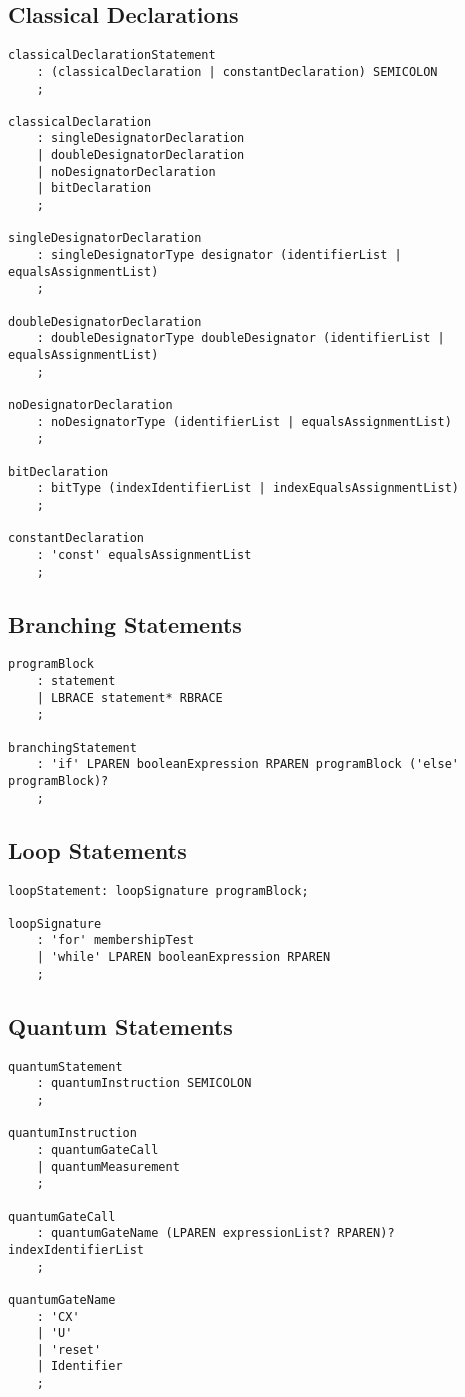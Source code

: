 \documentclass[12pt,a4paper]{report}
\theoremstyle{definition}
\theoremstyle{definition}
\theoremstyle{definition}
\begin{document}
\subsection{Classical Declarations}
\begin{lstlisting}
classicalDeclarationStatement
    : (classicalDeclaration | constantDeclaration) SEMICOLON
    ;

classicalDeclaration
    : singleDesignatorDeclaration
    | doubleDesignatorDeclaration
    | noDesignatorDeclaration
    | bitDeclaration
    ;

singleDesignatorDeclaration
    : singleDesignatorType designator (identifierList | equalsAssignmentList)
    ;

doubleDesignatorDeclaration
    : doubleDesignatorType doubleDesignator (identifierList | equalsAssignmentList)
    ;

noDesignatorDeclaration
    : noDesignatorType (identifierList | equalsAssignmentList)
    ;

bitDeclaration
    : bitType (indexIdentifierList | indexEqualsAssignmentList)
    ;

constantDeclaration
    : 'const' equalsAssignmentList
    ;
\end{lstlisting}

\subsection{Branching Statements}
\begin{lstlisting}
programBlock
    : statement
    | LBRACE statement* RBRACE
    ;

branchingStatement
    : 'if' LPAREN booleanExpression RPAREN programBlock ('else' programBlock)?
    ;
\end{lstlisting}


\subsection{Loop Statements}
\begin{lstlisting}
loopStatement: loopSignature programBlock;

loopSignature
    : 'for' membershipTest
    | 'while' LPAREN booleanExpression RPAREN
    ;
\end{lstlisting}


\subsection{Quantum Statements}
\begin{lstlisting}
quantumStatement
    : quantumInstruction SEMICOLON
    ;

quantumInstruction
    : quantumGateCall
    | quantumMeasurement
    ;

quantumGateCall
    : quantumGateName (LPAREN expressionList? RPAREN)? indexIdentifierList
    ;

quantumGateName
    : 'CX'
    | 'U'
    | 'reset'
    | Identifier
    ;
\end{lstlisting}
\end{document}
